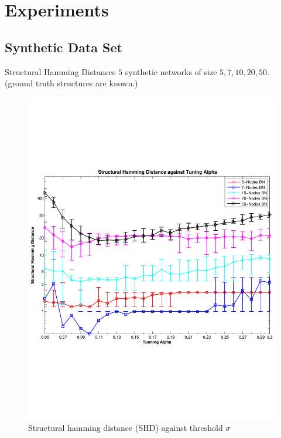 \section{Experiments}
\subsection{Synthetic Data Set}
\begin{frame}{Structural Hamming Distances}
$5$ synthetic networks of size $5,7,10,20,50$. (ground truth structures are known.)
\begin{figure}
\vspace{-2cm}
\centering
\includegraphics[scale=0.3]{imgs/shd-alpha-errb}
\vspace{-2cm}
\caption{Structural hamming distance (SHD) against threshold $\sigma$}
\end{figure} 
\end{frame}
